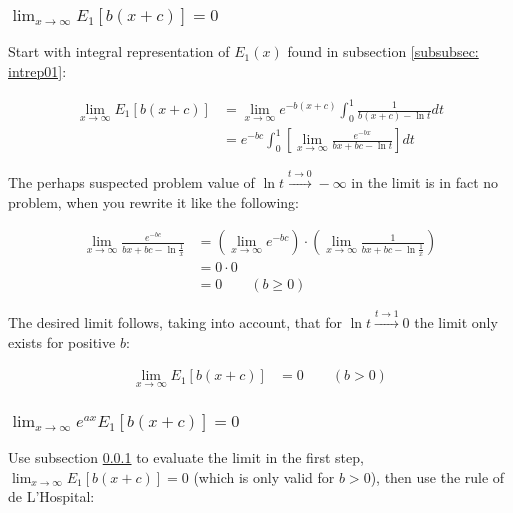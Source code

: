 \documentclass[bibliography=totocnumbered]{scrartcl}
\begin{document}
	\subsubsection[A limit of E1]{$\lim_{x\rightarrow\infty}E_1\left[b\left(x+c\right)\right]=0$}
	\label{subsubsec: specval01}
	
	Start with integral representation of $E_1\left(x\right)$ found in subsection \ref{subsubsec: intrep01}:
	
	\begin{align}
		\lim_{x\rightarrow\infty}E_1\left[b\left(x+c\right)\right]&=\lim_{x\rightarrow\infty}e^{-b\left(x+c\right)}\int_{0}^{1}\frac{1}{b\left(x+c\right)-\ln{t}}dt\\
		&=e^{-bc}\int_{0}^{1}\left[\lim_{x\rightarrow\infty}\frac{e^{-bx}}{bx+bc-\ln{t}}\right]dt
	\end{align}
	
	The perhaps suspected problem value of $\ln{t}\overset{t\rightarrow0}{\longrightarrow}-\infty$ in the limit is in fact no problem, when you rewrite it like the following:
	
	\begin{align}
	\lim_{x\rightarrow\infty}\frac{e^{-bc}}{bx+bc-\ln{\frac{1}{x}}}&=\left(\lim_{x\rightarrow\infty}e^{-bc}\right)\cdot\left(\lim_{x\rightarrow\infty}\frac{1}{bx+bc-\ln{\frac{1}{x}}}\right)\\
	&=0\cdot0\\
	&=0\qquad\left(b\geq0\right)
	\end{align}
	
	The desired limit follows, taking into account, that for $\ln{t}\overset{t\rightarrow1}{\longrightarrow}0$ the limit only exists for positive $b$:
	
	\begin{align}
		\lim_{x\rightarrow\infty}E_1\left[b\left(x+c\right)\right]&=0\qquad\left(b>0\right)
	\end{align}

	\subsubsection[A limit of E1]{$\lim_{x\rightarrow\infty}e^{ax}E_1\left[b\left(x+c\right)\right]=0$}
	\label{subsubsec: specval02}
	
	Use subsection \ref{subsubsec: specval01} to evaluate the limit in the first step, $\lim_{x\rightarrow\infty}E_1\left[b\left(x+c\right)\right]=0$ (which is only valid for $b>0$), then use the rule of de L'Hospital:
	
\end{document}

